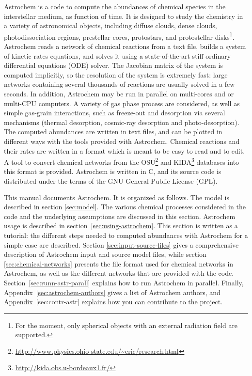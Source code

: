 \documentclass[a4paper,12pt]{article}
\begin{document}
Astrochem is a code to compute the abundances of chemical species in
the interstellar medium, as function of time. It is designed to study
the chemistry in a variety of astronomical objects, including diffuse
clouds, dense clouds, photodissociation regions, prestellar cores,
protostars, and protostellar disks\footnote{For the moment, only
  spherical objects with an external radiation field are
  supported.}. Astrochem reads a network of chemical reactions from a
text file, builds a system of kinetic rates equations, and solves it
using a state-of-the-art stiff ordinary differential equations (ODE)
solver. The Jacobian matrix of the system is computed implicitly, so
the resolution of the system is extremely fast: large networks
containing several thousands of reactions are usually solved in a few
seconds. In addition, Astrochem may be run in parallel on multi-cores
and or multi-CPU computers. A variety of gas phase process are
considered, as well as simple gas-grain interactions, such as
freeze-out and desorption via several mechanisms (thermal desorption,
cosmic-ray desorption and photo-desorption). The computed abundances
are written in text files, and can be plotted in different ways with
the tools provided with Astrochem. Chemical reactions and their rates
are written in a format which is meant to be easy to read and to
edit. A tool to convert chemical networks from the
OSU\footnote{\url{http://www.physics.ohio-state.edu/~eric/research.html}}
and KIDA\footnote{\url{http://kida.obs.u-bordeaux1.fr/}} databases
into this format is provided. Astrochem is written in C, and its
source code is distributed under the terms of the GNU General Public
License (GPL).

This manual documents Astrochem. It is organized as follows. The model
is described in section \ref{sec:model}. The various chemical
processes considered in the code and the underlying assumptions are
discussed in this section. Astrochem usage is described in
section~\ref{sec:using-astrochem}. This section is written as a
tutorial: the different steps needed to computed abundances with
Astrochem for a simple case are described. Section
\ref{sec:input-source-files} gives a comprehensive description of
Astrochem input and source model files, while section
\ref{sec:chemical-networks} presents the file format used for chemical
networks in Astrochem, as well as the different networks that are
provided with the code. Section~\ref{sec:runn-astr-parall} explains
how to run Astrochem in parallel. Finally,
Appendix~\ref{sec:astrochem-authors} gives a list of Astrochem
authors, and Appendix~\ref{sec:contr-astr} explains how you can
contribute to the project.
\end{document}

